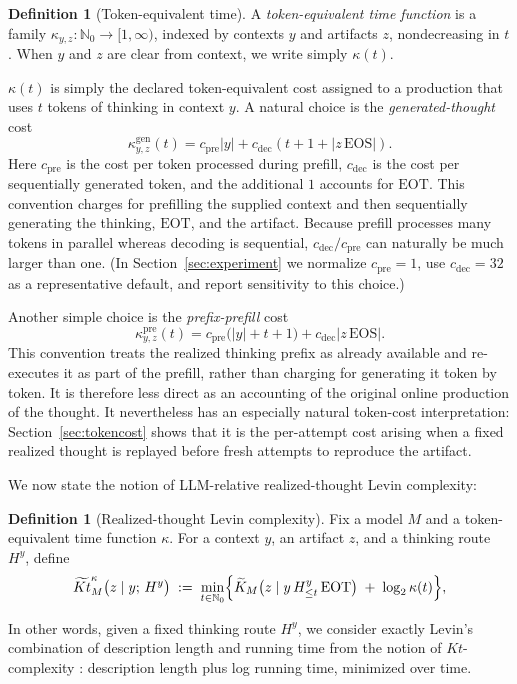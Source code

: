 \documentclass[letterpaper]{article} %
\theoremstyle{definition}
\newtheorem{definition}[theorem]{Definition}
\theoremstyle{remark}
\newcommand{\EOT}{\mathrm{EOT}}
\newcommand{\EOS}{\mathrm{EOS}}
\begin{document}
\begin{definition}[Token-equivalent time]\label{def:kappa}
A \emph{token-equivalent time function} is a family
$\kappa_{y,z} : \mathbb N_0 \to [1,\infty)$, indexed by contexts $y$ and
artifacts $z$, nondecreasing in $t$. When $y$ and $z$ are clear from
context, we write simply \(\kappa(t)\).
\end{definition}

\(\kappa(t)\) is simply the declared token-equivalent cost assigned to a
production that uses \(t\) tokens of thinking in context \(y\). A natural
choice is the \emph{generated-thought} cost
\[
  \kappa_{y,z}^{\mathrm{gen}}(t)
  =
  c_{\mathrm{pre}}|y|
  +
  c_{\mathrm{dec}}\left(t+1+
  \left|z\,\EOS\right|\right).
\]
Here \(c_{\mathrm{pre}}\) is the cost per token processed during prefill,
\(c_{\mathrm{dec}}\) is the cost per sequentially generated token, and the
additional \(1\) accounts for \(\EOT\). This convention charges for prefilling
the supplied context and then sequentially generating the thinking, \(\EOT\),
and the artifact. Because prefill processes many tokens in parallel whereas
decoding is sequential, \(c_{\mathrm{dec}}/c_{\mathrm{pre}}\) can naturally be
much larger than one. (In Section~\ref{sec:experiment} we normalize
\(c_{\mathrm{pre}}=1\), use \(c_{\mathrm{dec}}=32\) as a representative
default, and report sensitivity to this choice.)

Another simple choice is the \emph{prefix-prefill} cost
\[
  \kappa_{y,z}^{\mathrm{pre}}(t)
  =
  c_{\mathrm{pre}}\bigl(|y|+t+1\bigr)
  +
  c_{\mathrm{dec}}
  \left|z\,\EOS\right|.
\]
This convention treats the realized thinking prefix as already available and re-executes it as part of the prefill, rather than charging for generating it
token by token. It is therefore less direct as an accounting of the original
online production of the thought. It nevertheless has an especially natural
token-cost interpretation: Section~\ref{sec:tokencost} shows that it is the
per-attempt cost arising when a fixed realized thought is replayed before fresh
attempts to reproduce the artifact.

We now state the notion of LLM-relative realized-thought Levin complexity: 
\begin{definition}[Realized-thought Levin complexity]\label{def:kt}
Fix a model $M$ and a token-equivalent time function $\kappa$. For a context
$y$, an artifact $z$, and a thinking route $H^y$, define
\begin{equation}\label{eq:ktdef}
\widetilde{Kt}^{\kappa}_M\bigl(z \mid y;\, H^y\bigr)
\;:=\;
\min_{t \in \mathbb N_0}
\Bigl\{
\widetilde K_M\bigl(z \mid y\, H^y_{\le t}\, \EOT\bigr)
\;+\; \log_2 \kappa(t)
\Bigr\} ,
\end{equation}
\end{definition}
In other words, given a fixed thinking route $H^y$, we consider exactly Levin's combination of description length and running time from the notion of $Kt$-complexity \cite{Levin73}: description length plus log running time,
minimized over time. 
\end{document}
